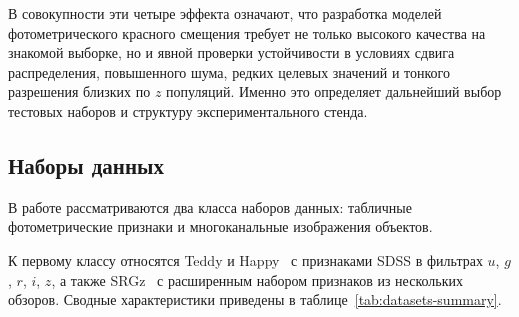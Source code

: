 \documentclass[12pt,a4paper]{article}
\begin{document}
В совокупности эти четыре эффекта означают, что разработка моделей фотометрического красного смещения требует не только высокого качества на знакомой выборке, но и явной проверки устойчивости в условиях сдвига распределения, повышенного шума, редких целевых значений и тонкого разрешения близких по $z$ популяций. Именно это определяет дальнейший выбор тестовых наборов и структуру экспериментального стенда.

\subsection{Наборы данных}

В работе рассматриваются два класса наборов данных: табличные фотометрические признаки и многоканальные изображения объектов.

К первому классу относятся Teddy и Happy~\cite{beck2017} с признаками SDSS в фильтрах $u$, $g$, $r$, $i$, $z$, а также SRGz~\cite{meshcheryakov2022} с расширенным набором признаков из нескольких обзоров. Сводные характеристики приведены в таблице~\ref{tab:datasets-summary}.
\end{document}
